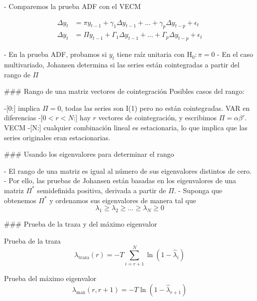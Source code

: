 - Comparemos la prueba ADF con el VECM
\begin{small}
\begin{align*}
\Delta y_t &=  \pi y_{t-1} +\gamma_1\Delta y_{t-1} + \dots +\gamma_p\Delta y_{t-p} + \epsilon_t \tag{univariado} \\
\Delta y_t &=  \Pi y_{t-1} +\Gamma_1\Delta y_{t-1} + \dots +\Gamma_p\Delta y_{t-p} + \epsilon_t \tag{multivariado}
\end{align*}
\end{small}
- En la prueba ADF, probamos si $y_t$ tiene raíz unitaria con $\text{H}_0: \pi=0$
- En el caso multivariado, Johansen determina si las series están cointegradas a partir del \alert{rango} de $\Pi$



### Rango de una matriz vectores de cointegración
Posibles casos del rango:
\begin{description}
-[0:] implica $\Pi=0$, todas las series son I(1) pero no están cointegradas. VAR en diferencias
-[$0<r<N$:] hay $r$ vectores de cointegración, y escribimos $\Pi=\alpha\beta'$. VECM
-[N:] \alert{cualquier} combinación lineal es estacionaria, lo que implica que las series originales eran estacionarias.
\end{description}


### Usando los eigenvalores para determinar el rango

- El rango de una matriz es igual al número de sus eigenvalores distintos de cero.
- Por ello, las pruebas de Johansen están basadas en los eigenvalores de una matriz $\Pi^*$ semidefinida positiva, \alert{derivada a partir de $\Pi$}.
- Suponga que obtenemos $\Pi^*$ y ordenamos sus eigenvalores de manera tal que
\begin{equation*}
\lambda_1 \geq \lambda_2 \geq \dots \geq \lambda_N \geq 0
\end{equation*}



### Prueba de la traza y del máximo eigenvalor
\begin{RESALTADO}{Prueba de la traza}
\begin{equation*}
\lambda_{\text{traza}}(r) = - T\sum_{i=r+1}^{N}\ln\left(1 - \hat{\lambda}_i\right)
\end{equation*}
\end{RESALTADO}



\begin{RESALTADO}{Prueba del máximo eigenvalor}
\begin{equation*}
\lambda_{\max}(r, r+1) = - T\ln\left(1 - \hat{\lambda}_{r+1}\right)
\end{equation*}
\end{RESALTADO}



